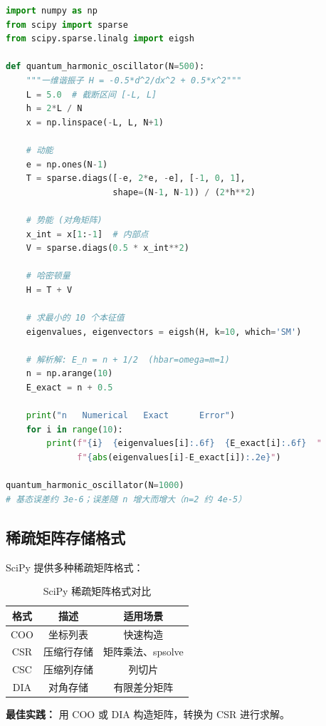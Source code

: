 \begin{lstlisting}[language=Python, caption=一维谐振子的数值本征值]
import numpy as np
from scipy import sparse
from scipy.sparse.linalg import eigsh

def quantum_harmonic_oscillator(N=500):
    """一维谐振子 H = -0.5*d^2/dx^2 + 0.5*x^2"""
    L = 5.0  # 截断区间 [-L, L]
    h = 2*L / N
    x = np.linspace(-L, L, N+1)

    # 动能
    e = np.ones(N-1)
    T = sparse.diags([-e, 2*e, -e], [-1, 0, 1],
                     shape=(N-1, N-1)) / (2*h**2)

    # 势能 (对角矩阵)
    x_int = x[1:-1]  # 内部点
    V = sparse.diags(0.5 * x_int**2)

    # 哈密顿量
    H = T + V

    # 求最小的 10 个本征值
    eigenvalues, eigenvectors = eigsh(H, k=10, which='SM')

    # 解析解: E_n = n + 1/2  (hbar=omega=m=1)
    n = np.arange(10)
    E_exact = n + 0.5

    print("n   Numerical   Exact      Error")
    for i in range(10):
        print(f"{i}  {eigenvalues[i]:.6f}  {E_exact[i]:.6f}  "
              f"{abs(eigenvalues[i]-E_exact[i]):.2e}")

quantum_harmonic_oscillator(N=1000)
# 基态误差约 3e-6；误差随 n 增大而增大（n=2 约 4e-5）
\end{lstlisting}

\subsection{稀疏矩阵存储格式}

SciPy 提供多种稀疏矩阵格式：

\begin{table}[h]
\centering
\caption{SciPy 稀疏矩阵格式对比}
\label{tab:sparse_formats}
\begin{tabular}{c|c|c}
\toprule
格式 & 描述 & 适用场景 \\
\midrule
COO & 坐标列表 & 快速构造 \\
CSR & 压缩行存储 & 矩阵乘法、spsolve \\
CSC & 压缩列存储 & 列切片 \\
DIA & 对角存储 & 有限差分矩阵 \\
\bottomrule
\end{tabular}
\end{table}

\textbf{最佳实践：} 用 COO 或 DIA 构造矩阵，转换为 CSR 进行求解。

